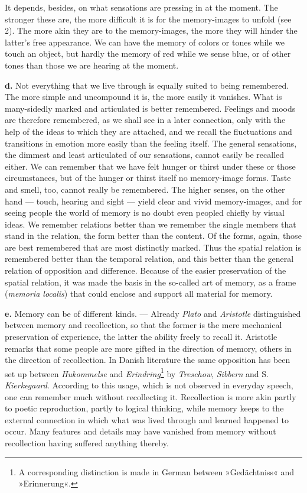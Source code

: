 \documentclass[12pt,a4paper]{book}
\newcommand{\opage}[1]{\marginnote{\footnotesize\textit{[#1]}}}
\begin{document}
It depends, besides, on what sensations are pressing in at the moment. The
stronger these are, the more difficult it is for the memory-images to
unfold (see 2). The more akin they are to the memory-images, the more they
will hinder the latter's free appearance. We can have the memory of colors
or tones while we touch an object, but hardly the memory of red while we
sense blue, or of other tones than those we are hearing at the moment.

\textbf{d.} Not everything that we live through is equally suited to being
remembered. The more simple and uncompound it is, the more easily it
vanishes. What is many-sidedly marked and articulated is better
remembered. Feelings and moods are therefore remembered, as we shall see in
a later connection, only with the help of the ideas to which they are
attached, and we recall the fluctuations and transitions in emotion more
easily than the feeling itself. The general sensations, the dimmest and
least articulated of our sensations, cannot easily be recalled either. We
can remember that we have felt hunger or thirst under these or those
circumstances, but of the hunger or thirst itself no memory-image forms.
Taste and smell, too, cannot really be remembered. The higher senses, on
the other hand --- touch, hearing and sight --- yield clear and vivid
memory-images, and for seeing people the world of memory is no doubt even
peopled chiefly by visual ideas. We remember relations better than we
remember the single members that stand in the relation, the form better
than the content. Of the forms, again, those are best remembered that are
most distinctly marked. Thus the spatial relation is remembered better
than the temporal relation, and this better than the general relation of
opposition and difference. Because of the easier preservation of the
spatial relation, it was made the basis in the so-called art of memory, as
a frame (\textit{memoria localis}) that could enclose and support all
material for memory.


\opage{184}\textbf{e.} Memory can be of different kinds. --- Already
\emph{Plato} and \emph{Aristotle} distinguished between memory and
recollection, so that the former is the mere mechanical preservation of
experience, the latter the ability freely to recall it. Aristotle remarks
that some people are more gifted in the direction of memory, others in the
direction of recollection. In Danish literature the same opposition has
been set up between \textit{Hukommelse} and
\textit{Erindring}\footnote{A corresponding distinction is made in German
between »Gedächtniss« and »Erinnerung«.} by \emph{Treschow},
\emph{Sibbern} and S. \emph{Kierkegaard}. According to this usage, which
is not observed in everyday speech, one can remember much without
recollecting it. Recollection is more akin partly to poetic reproduction,
partly to logical thinking, while memory keeps to the external connection
in which what was lived through and learned happened to occur. Many
features and details may have vanished from memory without recollection
having suffered anything thereby.
\end{document}

